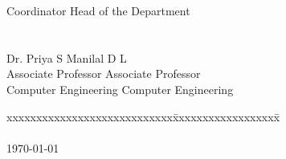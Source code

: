 \documentclass[11pt]{report}
\begin{document}
\begin{titlepage}
\begin{tabbing}
Coordinator\>\> Head of the Department
\\
\\
\\
Dr. Priya S \>\>Manilal D L\\
Associate Professor	\>\> Associate Professor\\
Computer Engineering	\>\>	Computer Engineering
\end{tabbing}
\vspace{.08in}
%
\begin{tabbing}
xxxxxxxxxxxxxxxxxxxxxxxxxxxx\= xxxxxxxxxxxxxxxxxx\= \kill
\\
\\
\today
\end{tabbing}

\end{titlepage}
\end{document}
